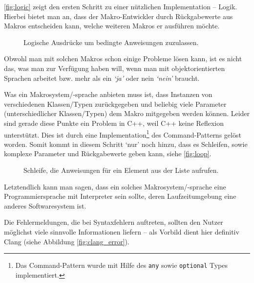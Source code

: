     \autoref{fig:logic} zeigt den ersten Schritt zu einer nützlichen Implementation -- Logik. Hierbei bietet man an, dass der Makro-Entwickler durch Rückgabewerte aus Makros entscheiden kann, welche weiteren Makros er ausführen möchte.

    \begin{figure}[H]
      \centering
      \caption{Logische Ausdrücke um bedingte Anweisungen zuzulassen.}
      \label{fig:logic}
    \end{figure}

    Obwohl man mit solchen Makros schon einige Probleme lösen kann, ist es nicht das, was man zur Verfügung haben will, wenn man mit objektorientierten Sprachen arbeitet bzw. mehr als ein \textit{`ja'} oder nein \textit{`nein'} braucht.

    Was ein Makrosystem/-sprache anbieten muss ist, dass Instanzen von verschiedenen Klassen/Typen zurückgegeben und beliebig viele Parameter (unterschiedlicher Klassen/Typen) dem Makro mitgegeben werden können. Leider sind gerade diese Punkte ein Problem in C++, weil C++ keine Reflexion\autocites{vinoski2005time}{ferber1989computational} unterstützt. Dies ist durch eine Implementation\footnote{%
      Das Command-Pattern wurde mit Hilfe des \texttt{any}
      sowie \texttt{optional}
      Types implementiert.
    }\spewnotes{}
    des Command-Patterns gelöst worden. Somit kommt in diesem Schritt `nur' noch hinzu, dass es Schleifen, sowie komplexe Parameter und Rückgabewerte geben kann, siehe \autoref{fig:loop}.

    \begin{figure}[H]
      \centering
      \caption{Schleife, die Anweisungen für ein Element aus der Liste aufrufen.}
      \label{fig:loop}
    \end{figure}

    Letztendlich kann man sagen, dass ein solches Makrosystem/-sprache eine Programmiersprache mit Interpreter sein sollte, deren Laufzeitumgebung eine anderes Softwaresystem ist.

    Die Fehlermeldungen, die bei Syntaxfehlern auftreten, sollten den Nutzer möglichst viele sinnvolle Informationen liefern -- als Vorbild dient hier definitiv Clang (siehe Abbildung \autoref{fig:clang_error}).

